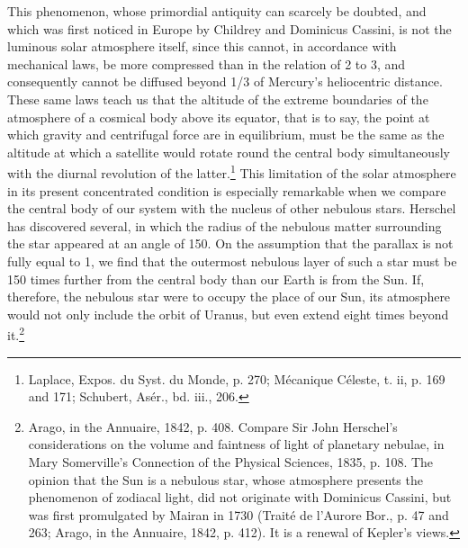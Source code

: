 This phenomenon, whose primordial antiquity can scarcely be doubted, and which was first noticed in Europe by Childrey and Dominicus Cassini, is not the luminous solar atmosphere itself, since this cannot, in accordance with mechanical laws, be more compressed than in the relation of 2 to 3, and consequently cannot be diffused beyond 1/3 of Mercury's heliocentric distance. These same laws teach us that the altitude of the extreme boundaries of the atmosphere of a cosmical body above its equator, that is to say, the point at which gravity and centrifugal force are in equilibrium, must be the same as the altitude at which a satellite would rotate round the central body simultaneously with the diurnal revolution of the latter.\footnote{Laplace, Expos. du Syst. du Monde, p. 270; Mécanique Céleste, t. ii, p. 169 and 171; Schubert, Asér., bd. iii., 206.}
This limitation of the solar atmosphere in its present concentrated condition is especially remarkable when we compare the central body of our system with the nucleus of other nebulous stars. Herschel has discovered several, in which the radius of the nebulous matter surrounding the star appeared at an angle of 150. On the assumption that the parallax is not fully equal to 1, we find that the outermost nebulous layer of such a star must be 150 times further from the central body than our Earth is from the Sun. If, therefore, the nebulous star were to occupy the place of our Sun, its atmosphere would not only include the orbit of Uranus, but even extend eight times beyond it.\footnote{Arago, in the Annuaire, 1842, p. 408. Compare Sir John Herschel's considerations on the volume and faintness of light of planetary nebulae, in Mary Somerville's Connection of the Physical Sciences, 1835, p. 108. The opinion that the Sun is a nebulous star, whose atmosphere presents the phenomenon of zodiacal light, did not originate with Dominicus Cassini, but was first promulgated by Mairan in 1730 (Trait\'{e} de l'Aurore Bor., p. 47 and 263; Arago, in the Annuaire, 1842, p. 412). It is a renewal of Kepler's views.}

